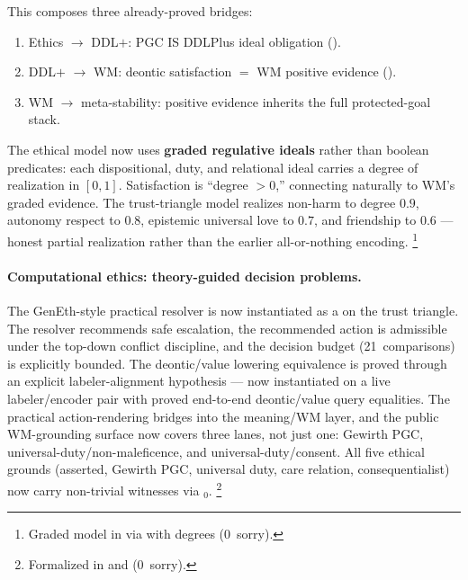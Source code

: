 \documentclass[11pt,openany]{report}
\begin{document}
\noindent
This composes three already-proved bridges:
\begin{enumerate}
\item Ethics $\to$ DDL$+$: PGC IS DDLPlus ideal obligation ().
\item DDL$+$ $\to$ WM: deontic satisfaction $=$ WM positive evidence ().
\item WM $\to$ meta-stability: positive evidence inherits the full protected-goal stack.
\end{enumerate}
\noindent
The ethical model now uses \textbf{graded regulative ideals} rather than
boolean predicates: each dispositional, duty, and relational ideal carries a
degree of realization in $[0,1]$.  Satisfaction is ``degree $> 0$,'' connecting
naturally to WM's graded evidence.  The trust-triangle model realizes non-harm
to degree $0.9$, autonomy respect to $0.8$, epistemic universal love to $0.7$,
and friendship to $0.6$ --- honest partial realization rather than the earlier
all-or-nothing encoding.%
\footnote{Graded model in
via  with  degrees (0~sorry).}

\paragraph{Computational ethics: theory-guided decision problems.}

The GenEth-style practical resolver is now instantiated as a
 on the trust triangle.  The resolver
recommends safe escalation, the recommended action is admissible under the
top-down conflict discipline, and the decision budget (21~comparisons) is
explicitly bounded.  The deontic/value lowering equivalence is proved through
an explicit labeler-alignment hypothesis --- now instantiated on a live
labeler/encoder pair with proved end-to-end deontic/value query equalities.
The practical action-rendering bridges into the meaning/WM layer, and the
public WM-grounding surface now covers three lanes, not just one: Gewirth PGC,
universal-duty/non-maleficence, and universal-duty/consent.  All five ethical
grounds (asserted, Gewirth PGC, universal duty, care relation, consequentialist)
now carry non-trivial witnesses via \(_0\).%
\footnote{Formalized in
and
(0~sorry).}
\end{document}
